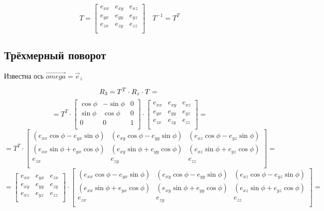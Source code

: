 \[
    T =
    \begin{bmatrix}
        e_{xx} & e_{xy} & e_{xz} \\
        e_{yx} & e_{yy} & e_{yz} \\
        e_{zx} & e_{zy} & e_{zz} \\
    \end{bmatrix}
    \quad
    T^{-1} = T^T
\]

\subsection{Трёхмерный поворот}
Известна ось $\vec{omega} = \vec{e}_z$

\[
    R_3 = T^T \cdot R_z \cdot T = \\
\]
\[
    = T^T \cdot
    \begin{bmatrix}
        \cos \phi & -\sin \phi & 0 \\
        \sin \phi &  \cos \phi & 0 \\
        0 & 0 & 1 \\
    \end{bmatrix} \cdot
    \begin{bmatrix}
        e_{xx} & e_{xy} & e_{xz} \\
        e_{yx} & e_{yy} & e_{yz} \\
        e_{zx} & e_{zy} & e_{zz} \\
    \end{bmatrix} =
\]
\[
    = T^T \cdot
    \begin{bmatrix}
        (e_{xx} \cos \phi - e_{yx} \sin \phi) &
        (e_{xy} \cos \phi - e_{yy} \sin \phi) &
        (e_{xz} \cos \phi - e_{yz} \sin \phi) \\
        (e_{xx} \sin \phi + e_{yx} \cos \phi) &
        (e_{xy} \sin \phi + e_{yy} \cos \phi) &
        (e_{xz} \sin \phi + e_{yz} \cos \phi) \\
        e_{zx} & e_{zy} & e_{zz} \\
    \end{bmatrix} =
\]
\[
    =
    \begin{bmatrix}
        e_{xx} & e_{yx} & e_{zx} \\
        e_{xy} & e_{yy} & e_{zy} \\
        e_{xz} & e_{yz} & e_{zz} \\
    \end{bmatrix}
    \cdot
    \begin{bmatrix}
        (e_{xx} \cos \phi - e_{yx} \sin \phi) &
        (e_{xy} \cos \phi - e_{yy} \sin \phi) &
        (e_{xz} \cos \phi - e_{yz} \sin \phi) \\
        (e_{xx} \sin \phi + e_{yx} \cos \phi) &
        (e_{xy} \sin \phi + e_{yy} \cos \phi) &
        (e_{xz} \sin \phi + e_{yz} \cos \phi) \\
        e_{zx} &
        e_{zy} &
        e_{zz} \\
    \end{bmatrix} =
\]
